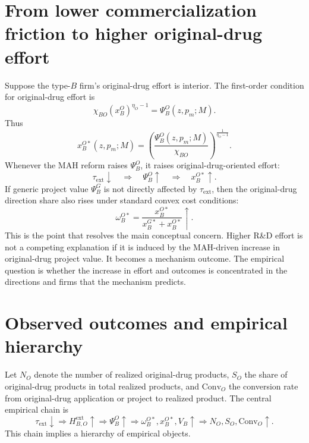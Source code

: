 \documentclass[12pt]{article}
\newcommand{\tauext}{\tau_{\mathrm{ext}}}
\newcommand{\Conv}{\mathrm{Conv}}
\begin{document}
\section{From lower commercialization friction to higher original-drug effort}

Suppose the type-$B$ firm's original-drug effort is interior. The first-order condition for original-drug effort is
\[
\chi_{BO}(x_B^O)^{\eta_O-1}=\Psi_B^O(z,p_m;M).
\]
Thus
\[
x_B^{O*}(z,p_m;M)=\left(\frac{\Psi_B^O(z,p_m;M)}{\chi_{BO}}\right)^{\frac{1}{\eta_O-1}}.
\]
Whenever the MAH reform raises $\Psi_B^O$, it raises original-drug-oriented effort:
\[
\tauext \downarrow \quad \Rightarrow \quad \Psi_B^O \uparrow \quad \Rightarrow \quad x_B^{O*}\uparrow.
\]
If generic project value $\Psi_B^G$ is not directly affected by $\tauext$, then the original-drug direction share also rises under standard convex cost conditions:
\[
\omega_B^{O*}=\frac{x_B^{O*}}{x_B^{G*}+x_B^{O*}}\uparrow.
\]
This is the point that resolves the main conceptual concern. Higher R\&D effort is not a competing explanation if it is induced by the MAH-driven increase in original-drug project value. It becomes a mechanism outcome. The empirical question is whether the increase in effort and outcomes is concentrated in the directions and firms that the mechanism predicts.

\section{Observed outcomes and empirical hierarchy}

Let $N_O$ denote the number of realized original-drug products, $S_O$ the share of original-drug products in total realized products, and $\Conv_O$ the conversion rate from original-drug application or project to realized product. The central empirical chain is
\[
\tauext \downarrow
\Rightarrow H_{B,O}^{\mathrm{ext}} \uparrow
\Rightarrow \Psi_B^O \uparrow
\Rightarrow \omega_B^{O*},x_B^{O*},V_B \uparrow
\Rightarrow N_O,S_O,\Conv_O \uparrow.
\]
This chain implies a hierarchy of empirical objects.
\end{document}
